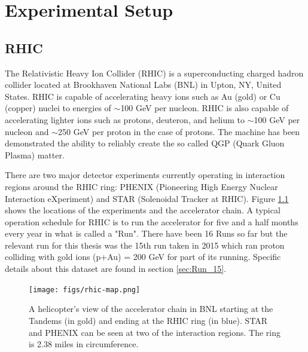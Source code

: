 \chapter{Experimental Setup}
\section{RHIC}
The Relativistic Heavy Ion Collider (RHIC) is a superconducting charged hadron collider located at Brookhaven National Labs (BNL) in Upton, NY, United States. RHIC is capable of accelerating heavy ions such as Au (gold) or Cu (copper) nuclei to energies of $\sim	$100 GeV per nucleon. RHIC is also capable of accelerating lighter ions such as protons, deuteron, and helium to $\sim	$100 GeV per nucleon and $\sim	$250 GeV per proton in the case of protons. The machine has been demonstrated the ability to reliably create the so called QGP (Quark Gluon Plasma) matter.

There are two major detector experiments currently operating in interaction regions around the RHIC ring: PHENIX (Pioneering High Energy Nuclear Interaction eXperiment) and STAR (Solenoidal Tracker at RHIC). Figure \ref{fig:rhic_heli_photo} shows the locations of the experiments and the accelerator chain. A typical operation schedule for RHIC is to run the accelerator for five and a half months every year in what is called a "Run". There have been 16 Runs so far but the relevant run for this thesis was the 15th run taken in 2015 which ran proton colliding with gold ions (p+Au) \sqsn = 200 GeV for part of its running. Specific details about this dataset are found in section \ref{sec:Run_15}.

\begin{figure}[!ht]
\begin{center}
\texttt{[image: figs/rhic-map.png]}
\caption{A helicopter's view of the accelerator chain in BNL starting at the Tandems (in gold) and ending at the RHIC ring (in blue). STAR and PHENIX can be seen at two of the interaction regions. The ring is 2.38 miles in circumference.}
\label{fig:rhic_heli_photo}
\end{center}
\end{figure}

